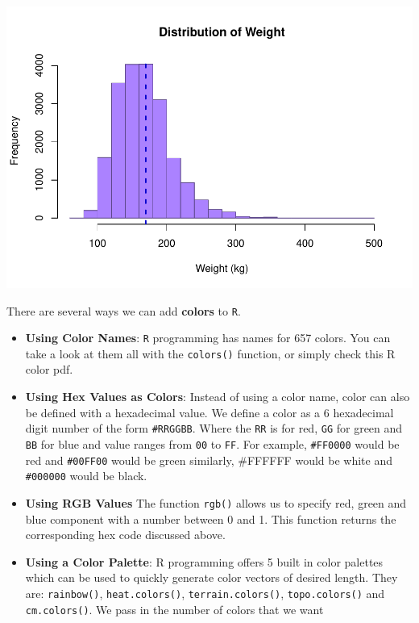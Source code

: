 \documentclass[
]{book}
\begin{document}
\includegraphics{_main_files/figure-latex/unnamed-chunk-130-1.pdf}

There are several ways we can add \textbf{colors} to \texttt{R}.

\begin{itemize}
\item
  \textbf{Using Color Names}: \texttt{R} programming has names for 657 colors. You can take a look at them all with the \texttt{colors()} function, or simply check this R color pdf.
\item
  \textbf{Using Hex Values as Colors}: Instead of using a color name, color can also be defined with a hexadecimal value. We define a color as a 6 hexadecimal digit number of the form \texttt{\#RRGGBB}. Where the \texttt{RR} is for red, \texttt{GG} for green and \texttt{BB} for blue and value ranges from \texttt{00} to \texttt{FF}. For example, \texttt{\#FF0000} would be red and \texttt{\#00FF00} would be green similarly, \#FFFFFF would be white and \texttt{\#000000} would be black.
\item
  \textbf{Using RGB Values} The function \texttt{rgb()} allows us to specify red, green and blue component with a number between 0 and 1. This function returns the corresponding hex code discussed above.
\item
  \textbf{Using a Color Palette}: R programming offers 5 built in color palettes which can be used to quickly generate color vectors of desired length. They are: \texttt{rainbow()}, \texttt{heat.colors()}, \texttt{terrain.colors()}, \texttt{topo.colors()} and \texttt{cm.colors()}. We pass in the number of colors that we want
\end{itemize}
\end{document}
